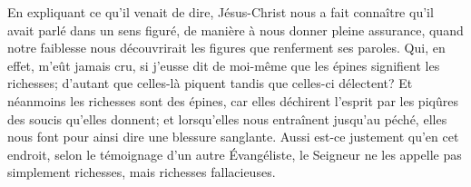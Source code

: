 En expliquant ce qu’il venait de dire,
	Jésus-Christ nous a fait connaître qu’il avait parlé dans un sens figuré,
	de manière à nous donner pleine assurance,
	quand notre faiblesse nous découvrirait les figures
		que renferment ses paroles.
Qui, en effet, m’eût jamais cru,
	si j’eusse dit de moi-même que les épines signifient les richesses;
	d’autant que celles-là piquent tandis que celles-ci délectent?
Et néanmoins les richesses sont des épines,
	car elles déchirent l’esprit par les piqûres des soucis qu’elles donnent;
	et lorsqu’elles nous entraînent jusqu’au péché,
	elles nous font pour ainsi dire une blessure sanglante.
Aussi est-ce justement qu’en cet endroit,
	selon le témoignage d’un autre Évangéliste,
	le Seigneur ne les appelle pas simplement richesses,
		mais richesses fallacieuses.

